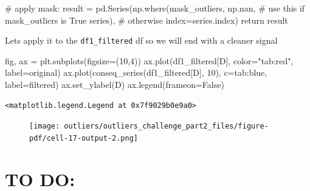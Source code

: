 \documentclass[
  letterpaper,
  DIV=11,
  numbers=noendperiod,
  oneside]{scrreprt}
\newenvironment{Shaded}{\begin{snugshade}}{\end{snugshade}}
\newcommand{\CommentTok}[1]{\textcolor[rgb]{0.37,0.37,0.37}{#1}}
\newcommand{\ControlFlowTok}[1]{\textcolor[rgb]{0.00,0.23,0.31}{#1}}
\newcommand{\DecValTok}[1]{\textcolor[rgb]{0.68,0.00,0.00}{#1}}
\newcommand{\NormalTok}[1]{\textcolor[rgb]{0.00,0.23,0.31}{#1}}
\newcommand{\OperatorTok}[1]{\textcolor[rgb]{0.37,0.37,0.37}{#1}}
\newcommand{\StringTok}[1]{\textcolor[rgb]{0.13,0.47,0.30}{#1}}
\newcommand{\VariableTok}[1]{\textcolor[rgb]{0.07,0.07,0.07}{#1}}
\begin{document}
\begin{Shaded}
\begin{Highlighting}[]
    \CommentTok{\# apply mask:}
\NormalTok{    result }\OperatorTok{=}\NormalTok{ pd.Series(np.where(mask\_outliers,}
\NormalTok{                                np.nan,  }\CommentTok{\# use this if mask\_outliers is True}
\NormalTok{                                series), }\CommentTok{\# otherwise}
\NormalTok{                            index}\OperatorTok{=}\NormalTok{series.index)}
    \ControlFlowTok{return}\NormalTok{ result}
\end{Highlighting}
\end{Shaded}

Lets apply it to the \texttt{df1\_filtered} df so we will end with a
cleaner signal

\begin{Shaded}
\begin{Highlighting}[]
\NormalTok{fig, ax }\OperatorTok{=}\NormalTok{ plt.subplots(figsize}\OperatorTok{=}\NormalTok{(}\DecValTok{10}\NormalTok{,}\DecValTok{4}\NormalTok{))}
\NormalTok{ax.plot(df1\_filtered[}\StringTok{\textquotesingle{}D\textquotesingle{}}\NormalTok{], color}\OperatorTok{=}\StringTok{"tab:red"}\NormalTok{, label}\OperatorTok{=}\StringTok{\textquotesingle{}original\textquotesingle{}}\NormalTok{)}
\NormalTok{ax.plot(conseq\_series(df1\_filtered[}\StringTok{\textquotesingle{}D\textquotesingle{}}\NormalTok{], }\DecValTok{10}\NormalTok{), c}\OperatorTok{=}\StringTok{\textquotesingle{}tab:blue\textquotesingle{}}\NormalTok{, label}\OperatorTok{=}\StringTok{\textquotesingle{}filtered\textquotesingle{}}\NormalTok{)}
\NormalTok{ax.set\_ylabel(}\StringTok{\textquotesingle{}D\textquotesingle{}}\NormalTok{)}
\NormalTok{ax.legend(frameon}\OperatorTok{=}\VariableTok{False}\NormalTok{)}
\end{Highlighting}
\end{Shaded}

\begin{verbatim}
<matplotlib.legend.Legend at 0x7f9029b0e9a0>
\end{verbatim}

\begin{figure}[H]

{\centering \texttt{[image: outliers/outliers\_challenge\_part2\_files/figure-pdf/cell-17-output-2.png]}

}

\end{figure}

\hypertarget{to-do}{%
\chapter{TO DO:}\label{to-do}}
\end{document}
